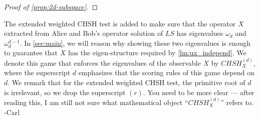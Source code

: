 \documentclass[11pt,letterpaper]{article}
\newcommand{\ket}[1]{|#1\rangle}
\newcommand{\1}{\mathbb{1}}
\newcommand{\CHSH}{CHSH^{(d)}}
\newcommand{\LS}{LS}
\newcommand{\tB}{\tilde{B}}
\def\carl#1{{\color{blue} #1 -Carl}}
\theoremstyle{definition}
\begin{document}
\begin{proof}[Proof of \cref{prop:2d-subspace}]
\end{proof}

The extended weighted CHSH test is added to make sure that the operator $X$ extracted from 
Alice and Bob's operator solution of $\LS$ has eigenvalues $\omega_d$ and $\omega_d^{d-1}$.
In \cref{sec:main}, we will reason why showing these two eigenvalues is enough to guarantee that 
$X$ has the eigen-structure required by \cref{lm:ux_independ}.
We denote this game that enforces the eigenvalues of the observable $X$ by
$\CHSH_X$, where the superscript $d$ emphasizes that the scoring rules of this game depend on $d$.
We remark that for the extended weighted CHSH test, the primitive root of $d$ is irrelevant,
so we drop the superscript $(r)$.
\carl{You need to be more clear --- after reading this, I am still not sure what mathematical object ``$\CHSH_X$'' refers to.}
\end{document}

